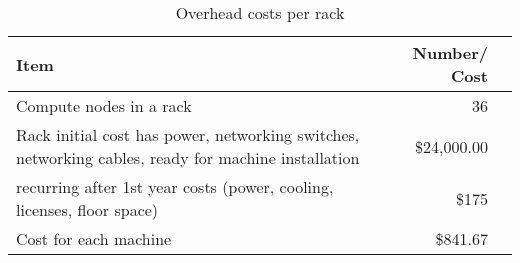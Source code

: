 \tiny \begin{longtable} { |p{}  |r  |r |} 
\caption{Overhead costs per rack \label{tab:overheads}}\\ 
\hline 
\textbf{Item}&\textbf{Number/ Cost} \\ \hline
{Compute nodes in a rack }&{36} \\ \hline
{Rack initial cost has power, networking switches, networking cables, ready for machine installation }&{\$24,000.00} \\ \hline
{recurring after 1st year costs (power, cooling, licenses, floor space) }&{\$175} \\ \hline
{Cost for each machine }&{\$841.67} \\ \hline
\end{longtable} \normalsize
